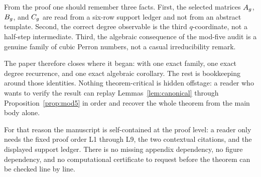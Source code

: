 \documentclass[11pt]{article}
\theoremstyle{remark}
\numberwithin{equation}{section}
\begin{document}
From the proof one should remember three facts.  First, the selected matrices
\(A_g\), \(B_g\), and \(C_g\) are read from a six-row support ledger and not
from an abstract template.  Second, the correct degree observable is the third
\(q\)-coordinate, not a half-step intermediate.  Third, the algebraic
consequence of the mod-five audit is a genuine family of cubic Perron numbers,
not a casual irreducibility remark.

The paper therefore closes where it began: with one exact family, one exact
degree recurrence, and one exact algebraic corollary.  The rest is bookkeeping
around those identities.  Nothing theorem-critical is hidden offstage: a reader
who wants to verify the result can replay Lemmas~\ref{lem:canonical} through
Proposition~\ref{prop:mod5} in order and recover the whole theorem from the
main body alone.

For that reason the manuscript is self-contained at the proof level: a reader
only needs the fixed proof order L1 through L9, the two contextual citations,
and the displayed support ledger.  There is no missing appendix dependency, no
figure dependency, and no computational certificate to request before the
theorem can be checked line by line.



\end{document}
